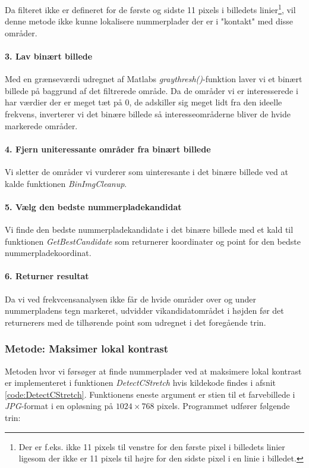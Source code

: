 Da filteret ikke er defineret for de første og sidste 11 pixels i billedets linier\footnote{Der er f.eks. ikke 11 pixels til venstre for den første pixel i billedets linier ligesom der ikke er 11 pixels til højre for den sidste pixel i en linie i billedet.}, vil denne metode ikke kunne lokalisere nummerplader der er i "kontakt" med disse områder.

\paragraph{3. Lav binært billede}
Med en grænseværdi udregnet af Matlabs \textit{graythresh()}-funktion laver vi et binært billede på baggrund af det filtrerede område. Da de områder vi er interesserede i har værdier der er meget tæt på 0, de adskiller sig meget lidt fra den ideelle frekvens, inverterer vi det binære billede så interesseområderne bliver de hvide markerede områder. 

\paragraph{4. Fjern uniteressante områder fra binært billede}
Vi sletter de områder vi vurderer som uinteresante i det binære billede ved at kalde funktionen \textit{BinImgCleanup}.

\paragraph{5. Vælg den bedste nummerpladekandidat}
Vi finde den bedste nummerpladekandidate i det binære billede med et kald til funktionen \textit{GetBestCandidate} som returnerer koordinater og point for den bedste nummerpladekoordinat.

\paragraph{6. Returner resultat}
Da vi ved frekvcensanalysen ikke får de hvide områder over og under nummerpladens tegn markeret, udvidder vikandidatområdet i højden før det returnerers med de tilhørende point som udregnet i det foregående trin.


\subsubsection{Metode: Maksimer lokal kontrast}
Metoden hvor vi førsøger at finde nummerplader ved at maksimere lokal kontrast er implementeret i funktionen \textit{DetectCStretch} hvis kildekode findes i afsnit \vref{code:DetectCStretch}. Funktionens eneste argument er stien til et farvebillede i \textit{JPG}-format i en opløsning på $1024 \times 768$ pixels. Programmet udfører følgende trin:

